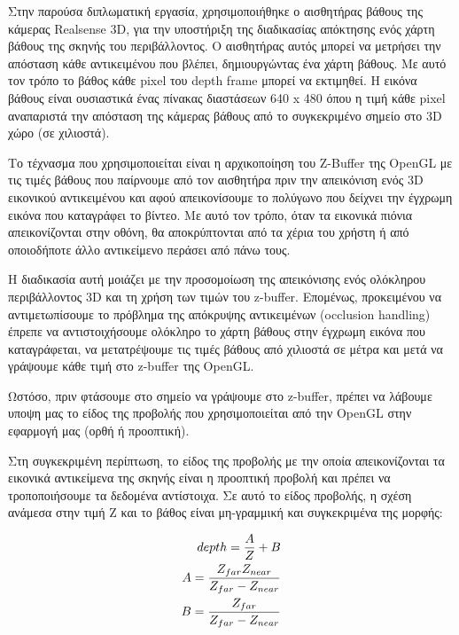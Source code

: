Στην παρούσα διπλωματική εργασία, χρησιμοποιήθηκε ο αισθητήρας βάθους της κάμερας Realsense 3D, για την υποστήριξη της διαδικασίας απόκτησης ενός χάρτη βάθους της σκηνής του περιβάλλοντος. O αισθητήρας αυτός μπορεί να μετρήσει την απόσταση κάθε αντικειμένου που βλέπει, δημιουργώντας ένα χάρτη βάθους. Με αυτό τον τρόπο το βάθος κάθε pixel του depth frame μπορεί να εκτιμηθεί. Η εικόνα βάθους είναι ουσιαστικά ένας πίνακας διαστάσεων 640 x 480  όπου η τιμή κάθε pixel αναπαριστά την απόσταση της κάμερας βάθους από το συγκεκριμένο σημείο στο 3D χώρο (σε χιλιοστά). 



Το τέχνασμα που χρησιμοποιείται είναι η αρχικοποίηση του Z-Buffer της OpenGL με τις τιμές βάθους που παίρνουμε από τον αισθητήρα πριν την απεικόνιση ενός 3D εικονικού αντικειμένου και αφού απεικονίσουμε το πολύγωνο που δείχνει την έγχρωμη εικόνα που καταγράφει το βίντεο. Με αυτό τον τρόπο, όταν τα εικονικά πιόνια απεικονίζονται στην οθόνη, θα αποκρύπτονται από τα χέρια του χρήστη ή από οποιοδήποτε άλλο αντικείμενο περάσει από πάνω τους. 

Η διαδικασία αυτή μοιάζει με την προσομοίωση της απεικόνισης ενός ολόκληρου περιβάλλοντος 3D και τη χρήση των τιμών του z-buffer. Eπομένως, προκειμένου να αντιμετωπίσουμε το πρόβλημα της απόκρυψης αντικειμένων (occlusion handling) έπρεπε να αντιστοιχήσουμε ολόκληρο το χάρτη βάθους στην έγχρωμη εικόνα που καταγράφεται, να μετατρέψουμε τις τιμές βάθους από χιλιοστά σε μέτρα και μετά να γράψουμε κάθε τιμή στο z-buffer της OpenGL.


Ωστόσο, πριν φτάσουμε στο σημείο να γράψουμε στο z-buffer, πρέπει να λάβουμε υποψη μας το είδος της προβολής που χρησιμοποιείται από την OpenGL στην εφαρμογή μας (ορθή ή προοπτική). 


Στη συγκεκριμένη περίπτωση, το είδος της προβολής με την οποία απεικονίζονται τα εικονικά αντικείμενα της σκηνής είναι η προοπτική προβολή και πρέπει να τροποποιήσουμε τα δεδομένα αντίστοιχα. Σε αυτό το είδος προβολής, η σχέση ανάμεσα στην τιμή Z και το βάθος είναι μη-γραμμική και συγκεκριμένα της μορφής:



\begin{equation}
\begin{aligned}
depth=\frac{A}{Z}+B \\ \vspace{0.5cm}
A=\frac{Z_{far}Z_{near}}{Z_{far}-Z_{near}}\\ \vspace{0.5cm}
B=\frac{Z_{far}}{Z_{far}-Z_{near}}
\end{aligned}
\end{equation}

